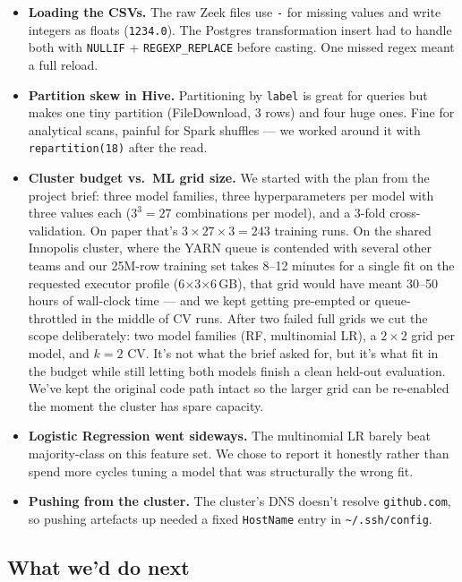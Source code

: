 \documentclass[11pt,a4paper]{article}
\begin{document}
\begin{itemize}[leftmargin=2em]
    \item \textbf{Loading the CSVs.} The raw Zeek files use \texttt{-} for
    missing values and write integers as floats (\texttt{1234.0}). The
    Postgres transformation insert had to handle both with
    \texttt{NULLIF} + \texttt{REGEXP\_REPLACE} before casting. One
    missed regex meant a full reload.
    \item \textbf{Partition skew in Hive.} Partitioning by \texttt{label}
    is great for queries but makes one tiny partition (FileDownload,
    3 rows) and four huge ones. Fine for analytical scans, painful for
    Spark shuffles --- we worked around it with
    \texttt{repartition(18)} after the read.
    \item \textbf{Cluster budget vs.\ ML grid size.} We started with the
    plan from the project brief: three model families, three hyperparameters
    per model with three values each ($3^{3} = 27$ combinations per model),
    and a 3-fold cross-validation. On paper that's $3 \times 27 \times 3 =
    243$ training runs. On the shared Innopolis cluster, where the YARN
    queue is contended with several other teams and our 25M-row training
    set takes 8--12 minutes for a single fit on the requested executor
    profile (6$\times$3$\times$6\,GB), that grid would have meant 30--50
    hours of wall-clock time --- and we kept getting pre-empted or
    queue-throttled in the middle of CV runs. After two failed full grids
    we cut the scope deliberately: two model families (RF, multinomial LR),
    a $2\times2$ grid per model, and $k=2$ CV. It's not what the brief
    asked for, but it's what fit in the budget while still letting both
    models finish a clean held-out evaluation. We've kept the original
    code path intact so the larger grid can be re-enabled the moment the
    cluster has spare capacity.
    \item \textbf{Logistic Regression went sideways.} The multinomial LR
    barely beat majority-class on this feature set. We chose to report it
    honestly rather than spend more cycles tuning a model that was
    structurally the wrong fit.
    \item \textbf{Pushing from the cluster.} The cluster's DNS doesn't
    resolve \texttt{github.com}, so pushing artefacts up needed a fixed
    \texttt{HostName} entry in \texttt{\textasciitilde/.ssh/config}.
\end{itemize}

\subsection{What we'd do next}
\end{document}
